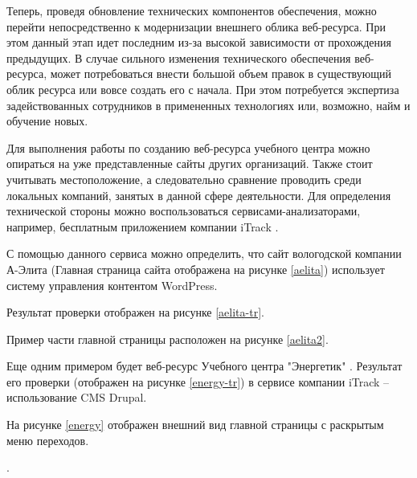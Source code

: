 Теперь, проведя обновление технических компонентов обеспечения, можно перейти непосредственно к модернизации внешнего облика веб-ресурса.
При этом данный этап идет последним из-за высокой зависимости от прохождения предыдущих.
В случае сильного изменения технического обеспечения веб-ресурса, может потребоваться внести большой объем правок в существующий облик ресурса или вовсе создать его с начала.
При этом потребуется экспертиза задействованных сотрудников в примененных технологиях или, возможно, найм и обучение новых.

Для выполнения работы по созданию веб-ресурса учебного центра можно опираться на уже представленные сайты других организаций.
Также стоит учитывать местоположение, а следовательно сравнение проводить среди локальных компаний, занятых в данной сфере деятельности.
Для определения технической стороны можно воспользоваться сервисами-анализаторами, например, бесплатным приложением компании iTrack \cite{iTrack}.

С помощью данного сервиса можно определить, что сайт вологодской компании А-Элита \cite{aelita} (Главная страница сайта отображена на рисунке \ref{aelita}) использует систему управления контентом WordPress.


Результат проверки отображен на рисунке \ref{aelita-tr}.


Пример части главной страницы расположен на рисунке \ref{aelita2}.


Еще одним примером будет веб-ресурс Учебного центра "Энергетик" \cite{energy}.
Результат его проверки (отображен на рисунке \ref{energy-tr}) в сервисе компании iTrack -- использование CMS Drupal.


На рисунке \ref{energy} отображен внешний вид главной страницы с раскрытым меню переходов.

.


\clearpage
